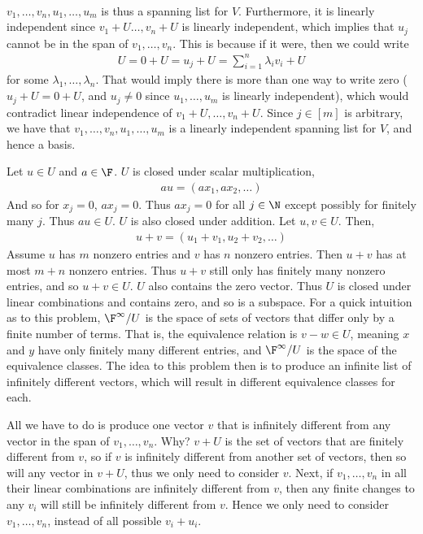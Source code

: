 \documentclass{book}
\begin{document}
\begin{enumerate}[label=\arabic*)]
\begin{align*}
      \end{align*}
      $v_1, \dots, v_n, u_1, \dots, u_m$ is thus a spanning list for $V$. Furthermore, it is linearly independent since $v_1 + U \dots, v_n + U$ is linearly independent, which implies that $u_j$
      cannot be in the span of $v_1, \dots, v_n$. This is because if it were, then we could write 
      \begin{align*}
        U = 0 + U = u_j + U = \sum_{i = 1}^{n}\lambda_iv_i + U
      \end{align*}
      for some $\lambda_1, \dots, \lambda_n$. That would imply there is more than one way to write zero ($u_j + U = 0 + U$, and $u_j \neq 0$ since $u_1, \dots, u_m$ is linearly
      independent), which would contradict linear independence of $v_1 + U, \dots, v_n + U$. Since $j \in [m]$ is arbitrary, we have that $v_1, \dots, v_n, u_1, \dots, u_m$ is a linearly
      independent spanning list for $V$, and hence a basis.
    \ii
      \begin{enumerate}[label=\alph*)]
        \ii  
          Let $u \in U$ and $a \in \F$. $U$ is closed under scalar multiplication,
          \begin{align*}
            au = (ax_1, ax_2, \dots)
          \end{align*}
          And so for $x_j = 0$, $ax_j = 0$. Thus $ax_j = 0$ for all $j \in \N$ except possibly for finitely many $j$. Thus $au \in U$. $U$ is also closed under addition. Let $u, v \in U$. Then,
          \begin{align*}
            u + v = (u_1 + v_1, u_2 + v_2, \dots)
          \end{align*}
          Assume $u$ has $m$ nonzero entries and $v$ has $n$ nonzero entries. Then $u + v$ has at most $m + n$ nonzero entries. Thus $u + v$ still only has finitely many nonzero entries, and so
          $u + v \in U$. $U$ also contains the zero vector. Thus $U$ is closed under linear combinations and contains zero, and so is a subspace.
        \ii
          For a quick intuition as to this problem, $\F^\infty/U$ is the space of sets of vectors that differ only by a finite number of terms. That is, the equivalence relation is $v - w
          \in U$, meaning $x$ and $y$ have only finitely many different entries, and $\F^\infty/U$ is the space of the equivalence classes. The idea to this problem then is to produce an
          infinite list of infinitely different vectors, which will result in different equivalence classes for each. 


          All we have to do is produce one vector $v$ that is infinitely different from any vector in the span of $v_1, \dots, v_n$. Why? $v + U$ is the set of vectors that are finitely
          different from $v$, so if $v$ is infinitely different from another set of vectors, then so will any vector in $v + U$, thus we only need to consider $v$. Next, if $v_1, \dots, v_n$
          in all their linear combinations are infinitely different from $v$, then any finite changes to any $v_i$ will still be infinitely different from $v$. Hence we only need to consider
          $v_1, \dots, v_n$, instead of all possible $v_i + u_i$.



\end{enumerate}
\end{enumerate}
\end{document}
